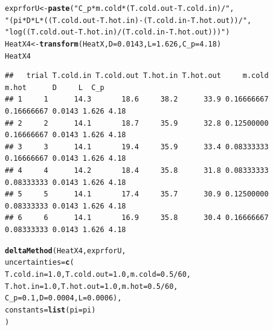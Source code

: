 \documentclass[twoside]{book}\usepackage[]{graphicx}\usepackage[]{xcolor}
\makeatletter
\newcommand{\hlnum}[1]{\textcolor[rgb]{0.686,0.059,0.569}{#1}}%
\newcommand{\hlstr}[1]{\textcolor[rgb]{0.192,0.494,0.8}{#1}}%
\newcommand{\hlopt}[1]{\textcolor[rgb]{0,0,0}{#1}}%
\newcommand{\hlstd}[1]{\textcolor[rgb]{0.345,0.345,0.345}{#1}}%
\newcommand{\hlkwb}[1]{\textcolor[rgb]{0.69,0.353,0.396}{#1}}%
\newcommand{\hlkwc}[1]{\textcolor[rgb]{0.333,0.667,0.333}{#1}}%
\newcommand{\hlkwd}[1]{\textcolor[rgb]{0.737,0.353,0.396}{\textbf{#1}}}%
\newenvironment{kframe}{%
 \def\at@end@of@kframe{}%
 \ifinner\ifhmode%
  \def\at@end@of@kframe{\end{minipage}}%
  \begin{minipage}{\columnwidth}%
 \fi\fi%
 \def\FrameCommand##1{\hskip\@totalleftmargin \hskip-\fboxsep
 \colorbox{shadecolor}{##1}\hskip-\fboxsep
     \hskip-\linewidth \hskip-\@totalleftmargin \hskip\columnwidth}%
 \MakeFramed {\advance\hsize-\width
   \@totalleftmargin\z@ \linewidth\hsize
   \@setminipage}}%
 {\par\unskip\endMakeFramed%
 \at@end@of@kframe}
\newenvironment{knitrout}{}{} %
\makeatother
\begin{document}
\begin{knitrout}
\color{fgcolor}\begin{kframe}
\begin{alltt}
\hlstd{exprforU} \hlkwb{<-} \hlkwd{paste}\hlstd{(}\hlstr{"C_p * m.cold * (T.cold.out - T.cold.in) /"}\hlstd{,}
                  \hlstr{"( pi * D *  L  * ((T.cold.out - T.hot.in) - (T.cold.in - T.hot.out)) /"}\hlstd{,}
                  \hlstr{" log ( (T.cold.out - T.hot.in) / (T.cold.in - T.hot.out) ) )"}\hlstd{)}
\hlstd{HeatX4} \hlkwb{<-} \hlkwd{transform}\hlstd{(HeatX,} \hlkwc{D}\hlstd{=}\hlnum{0.0143}\hlstd{,} \hlkwc{L}\hlstd{=}\hlnum{1.626}\hlstd{,} \hlkwc{C_p}\hlstd{=}\hlnum{4.18}\hlstd{)}
\hlstd{HeatX4}
\end{alltt}
\begin{verbatim}
##   trial T.cold.in T.cold.out T.hot.in T.hot.out     m.cold      m.hot      D     L  C_p
## 1     1      14.3       18.6     38.2      33.9 0.16666667 0.16666667 0.0143 1.626 4.18
## 2     2      14.1       18.7     35.9      32.8 0.12500000 0.16666667 0.0143 1.626 4.18
## 3     3      14.1       19.4     35.9      33.4 0.08333333 0.16666667 0.0143 1.626 4.18
## 4     4      14.2       18.4     35.8      31.8 0.08333333 0.08333333 0.0143 1.626 4.18
## 5     5      14.1       17.4     35.7      30.9 0.12500000 0.08333333 0.0143 1.626 4.18
## 6     6      14.1       16.9     35.8      30.4 0.16666667 0.08333333 0.0143 1.626 4.18
\end{verbatim}
\begin{alltt}
\hlkwd{deltaMethod}\hlstd{( HeatX4, exprforU,}
  \hlkwc{uncertainties}\hlstd{=}\hlkwd{c}\hlstd{(}
        \hlkwc{T.cold.in}\hlstd{=}\hlnum{1.0}\hlstd{,} \hlkwc{T.cold.out}\hlstd{=}\hlnum{1.0}\hlstd{,} \hlkwc{m.cold} \hlstd{=} \hlnum{0.5}\hlopt{/}\hlnum{60}\hlstd{,}
        \hlkwc{T.hot.in}\hlstd{=}\hlnum{1.0}\hlstd{,} \hlkwc{T.hot.out}\hlstd{=}\hlnum{1.0}\hlstd{,} \hlkwc{m.hot} \hlstd{=} \hlnum{0.5}\hlopt{/}\hlnum{60}\hlstd{,}
        \hlkwc{C_p} \hlstd{=} \hlnum{0.1}\hlstd{,} \hlkwc{D}\hlstd{=}\hlnum{0.0004}\hlstd{,} \hlkwc{L}\hlstd{=}\hlnum{0.0006}\hlstd{),}
  \hlkwc{constants} \hlstd{=} \hlkwd{list}\hlstd{(}\hlkwc{pi}\hlstd{=pi)}
\hlstd{)}
\end{alltt}



\end{kframe}
\end{knitrout}
\end{document}

